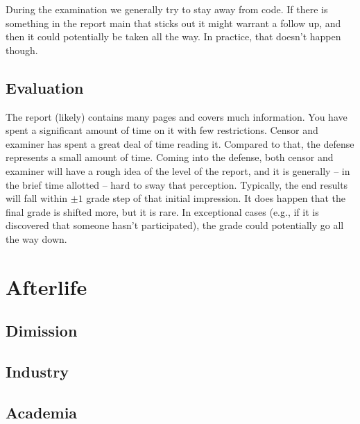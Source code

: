 \documentclass[a4paper, oneside]{memoir}
\begin{document}
During the examination we generally try to stay away from code. If there is something in the report main that sticks out it might warrant a follow up, and then it could potentially be taken all the way. In practice, that doesn't happen though.


\section{Evaluation}

The report (likely) contains many pages and covers much information. You have spent a significant amount of time on it with few restrictions. Censor and examiner has spent a great deal of time reading it. Compared to that, the defense represents a small amount of time. Coming into the defense, both censor and examiner will have a rough idea of the level of the report, and it is generally -- in the brief time allotted -- hard to sway that perception. Typically, the end results will fall within $\pm 1$ grade step of that initial impression. It does happen that the final grade is shifted more, but it is rare. In exceptional cases (e.g., if it is discovered that someone hasn't participated), the grade could potentially go all the way down.

\chapter{Afterlife}
\label{chap:afterlife}

\section{Dimission}


\section{Industry}



\section{Academia}
\end{document}
